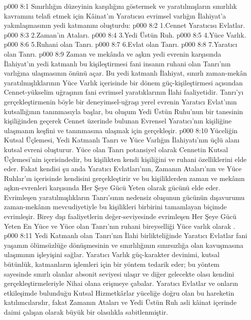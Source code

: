 \vs p000 8:1 Sınırlılığın düzeyinin karşılığını göstermek ve yaratılmışların sınırlılık kavramını telafi etmek için Kâinat’ın Yaratıcısı evrimsel varlığın İlahiyat’a yakınlaşmasının yedi katmanını oluşturdu:
\vs p000 8:2 1.\bibnobreakspace Cennet Yaratıcısı Evlatlar.
\vs p000 8:3 2.\bibnobreakspace Zaman’ın Ataları.
\vs p000 8:4 3.\bibnobreakspace Yedi Üstün Ruh.
\vs p000 8:5 4.\bibnobreakspace Yüce Varlık.
\vs p000 8:6 5.\bibnobreakspace Ruhani olan Tanrı.
\vs p000 8:7 6.\bibnobreakspace Evlat olan Tanrı.
\vs p000 8:8 7.\bibnobreakspace Yaratıcı olan Tanrı.
\vs p000 8:9 Zaman ve mekânda ve aşkın yedi evrenin karşısında İlahiyat’ın yedi katmanlı bu kişileştirmesi fani insanın ruhani olan Tanrı’nın varlığına ulaşmasının önünü açar. Bu yedi katmanlı İlahiyat, sınırlı zaman\hyp{}mekân yaratılmışlıklarının Yüce Varlık içerisinde bir dönem güç\hyp{}kişileştirmesi açısından Cennet\hyp{}yükselim uğraşının fani evrimsel yaratıklarının İlahi faaliyetidir. Tanrı’yı gerçekleştirmenin böyle bir deneyimsel\hyp{}uğraşı yerel evrenin Yaratıcı Evlat’ının kutsallığının tanınmasıyla başlar, bu oluşum Yedi Üstün Ruhu’nun bir tanesinin kişiliğinden geçerek Cennet üzerinde bulunan Evrensel Yaratıcı’nın kişiliğine ulaşmanın keşfini ve tanınmasına ulaşmak için gerçekleşir.
\vs p000 8:10 Yüceliğin Kutsal Üçlemesi, Yedi Katmanlı Tanrı ve Yüce Varlığın İlahiyatı’nın üçlü alanı kutsal evreni oluşturur. Yüce olan Tanrı potansiyel olarak Cennetin Kutsal Üçlemesi’nin içerisindedir, bu kişilikten kendi kişiliğini ve ruhani özelliklerini elde eder. Fakat kendisi şu anda Yaratıcı Evlatları’nın, Zamanın Ataları’nın ve Yüce Ruhlar’ın içerisinde kendisini gerçekleştirir ve bu kişiliklerden zaman ve mekânın aşkın\hyp{}evrenleri karşısında Her Şeye Gücü Yeten olarak gücünü elde eder. Evrimleşen yaratılmışlıkların Tanrı’sının nedensiz oluşunun gücünün dışavurumu zaman\hyp{}mekânın mevcudiyetiyle bu kişilikleri birbirini tamamlayan biçimde evrimleşir. Birey dışı faaliyetlerin değer\hyp{}seviyesinde evrimleşen Her Şeye Gücü Yeten En Yüce ve Yüce olan Tanrı’nın ruhani bireyselliği Yüce varlık olarak .
\vs p000 8:11 Yedi Katmanlı olan Tanrı’nın İlahi birlikteliğinde Yaratıcı Evlatlar fani yaşamın ölümsüzlüğe dönüşmesinin ve sınırlılığının sınırsızlığa olan kavuşmasına ulaşımının işleyişini sağlar. Yaratıcı Varlık güç\hyp{}karakter devinimi, kutsal bütünlük, katmanların  işlemleri için bir yöntem tedarik eder; bu yöntem sayesinde sınırlı olanlar absonit seviyesi ulaşır ve diğer gelecekte olası kendini gerçekleştirmeleriyle Nihai olana erişmeye çabalar. Yaratıcı Evlatlar ve onların etkileşimde bulunduğu Kutsal Hizmetkârlar yüceliğe doğru olan bu hareketin katılımcılarıdır, fakat Zamanın Ataları ve Yedi Üstün Ruh asli kâinat içerinde daimi çalışan olarak büyük bir olasılıkla sabitlenmiştir.
